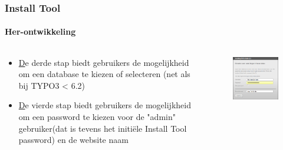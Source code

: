 
\begin{frame}[fragile]
	\frametitle{Install Tool}
	\framesubtitle{Her-ontwikkeling}

	\begin{columns}[T]

		\begin{column}{.5\textwidth}
			\begin{itemize}
				\item \underline De {derde} stap biedt gebruikers de mogelijkheid om een database te kiezen of selecteren\newline
					(net als bij TYPO3 < 6.2)
				\item \underline De {vierde} stap biedt gebruikers de mogelijkheid om een password te kiezen voor de "admin" gebruiker\newline (dat is tevens het initiële Install Tool password) en de website naam
			\end{itemize}
		\end{column}

		\begin{column}{.5\textwidth}
			\begin{figure}\vspace*{-0.4cm}
		\includegraphics[width=0.6\linewidth]{Images/InstallTool/AdminPasswordAndSiteName.png}
			\end{figure}
		\end{column}

	\end{columns}

\end{frame}

